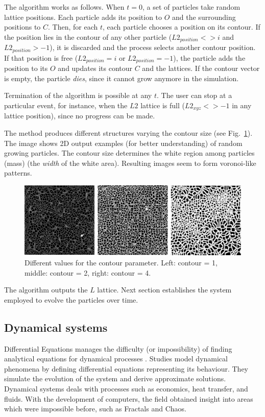 \documentclass[oneside,a4paper,english,links]{amca}
\begin{document}
The algorithm works as follows. When $t = 0$, a set of particles take random lattice positions. Each particle adds its position to $O$ and the surrounding positions to $C$. Then, for each $t$, each particle chooses a position on its contour. If the position lies in the contour of any other particle ($L2_{position} <> i$ and $L2_{position} > -1$), it is discarded and the process selects another contour position. If that position is free ($L2_{position} = i$ or $L2_{position} = -1$), the particle adds the position to its $O$ and updates its contour $C$ and the lattices. If the contour vector is empty, the particle {\em dies}, since it cannot grow anymore in the simulation.

Termination of the algorithm is possible at any $t$. The user can stop at a particular event, for instance, when the $L2$ lattice is full ($L2_{xyz} <> -1$ in any lattice position), since no progress can be made.

The method produces different structures varying the contour size (see Fig.~\ref{fg:fig1}). The image shows 2D output examples (for better understanding) of random growing particles. The contour size determines the white region among particles (mass) (the {\em width} of the white area). Resulting images seem to form voronoi-like patterns.


\begin{figure}[htb!]
  \centerline{\includegraphics[scale=0.22]{fig1.pdf}}
  \caption{Different values for the contour parameter. Left: contour = 1, middle: contour = 2, right: contour = 4.}
  \label{fg:fig1}
\end{figure}

The algorithm outputs the $L$ lattice. Next section establishes the system employed to evolve the particles over time.

\subsection{Dynamical systems}

Differential Equations manages the
difficulty (or impossibility) of finding analytical equations for
dynamical processes \citep{Strogatz2001}. Studies model dynamical phenomena by defining differential equations representing its behaviour. They simulate the evolution of the system and derive approximate solutions. Dynamical systems deals with processes such as economics, heat transfer, and fluids. With the development of computers, the field obtained insight into areas which were impossible before, such as Fractals \citep{Mandelbrot83}
and Chaos.
\end{document}
